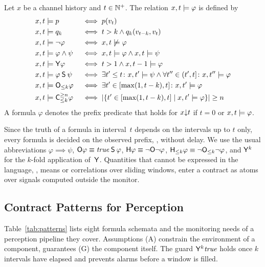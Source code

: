 \begin{definition}[Semantics]\label{def:semantics}
  Let $x$ be a channel history and $t \in \natp$. The relation $x, t \sat \varphi$ is defined by
  \begin{align*}
    x, t &\sat p &&\iff p(v_t)\\
    x, t &\sat q_k &&\iff t > k \land q_k(v_{t-k}, v_t)\\
    x, t &\sat \lnot\varphi &&\iff x, t \not\sat \varphi\\
    x, t &\sat \varphi \land \psi &&\iff x, t \sat \varphi \land x, t \sat \psi\\
    x, t &\sat \Yop\varphi &&\iff t > 1 \land x, t-1 \sat \varphi\\
    x, t &\sat \varphi \Sop \psi &&\iff \exists t' \leq t\colon
      x, t' \sat \psi \land \forall t'' \in (t', t]\colon x, t'' \sat \varphi\\
    x, t &\sat \Owin{k}\varphi &&\iff \exists t' \in [\max(1, t-k), t]\colon
      x, t' \sat \varphi\\
    x, t &\sat \Cwin{k}{n}\varphi &&\iff \lvert\{t' \in [\max(1, t-k), t] \mid
      x, t' \sat \varphi\}\rvert \geq n
  \end{align*}
  A formula $\varphi$ denotes the prefix predicate that holds for $\pre{x}{t}$ if $t = 0$ or $x, t \sat \varphi$.
\end{definition}

\noindent Since the truth of a formula in interval~$t$ depends on the intervals up to $t$ only, every formula is decided on the observed prefix, \ie, without delay. We use the usual abbreviations $\varphi \implies \psi$, $\Oop\varphi \equiv \true \Sop \varphi$, $\Hop\varphi \equiv \lnot\Oop\lnot\varphi$, $\Hwin{k}\varphi \equiv \lnot\Owin{k}\lnot\varphi$, and $\Yop^k$ for the $k$-fold application of~$\Yop$. Quantities that cannot be expressed in the language, \eg, means or correlations over sliding windows, enter a contract as atoms over signals computed outside the monitor.

\subsection{Contract Patterns for Perception}\label{sec:patterns}
Table~\ref{tab:patterns} lists eight formula schemata and the monitoring needs of a perception pipeline they cover. Assumptions (A) constrain the environment of a component, guarantees (G) the component itself. The guard $\Yop^k\true$ holds once $k$ intervals have elapsed and prevents alarms before a window is filled.

